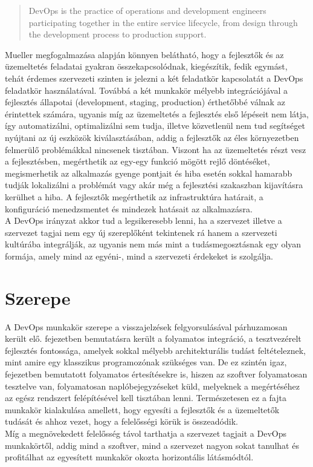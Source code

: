 \begin{quote}
DevOps is the practice of operations and development engineers participating together in the entire service lifecycle, from design through the development process to production support.
\end{quote}
\begin{flushright}
\citet*{agile_admin}
\end{flushright}

Mueller megfogalmazása alapján könnyen belátható, hogy a fejlesztők és az üzemeltetés feladatai gyakran összekapcsolódnak, kiegészítik, fedik egymást, tehát érdemes szervezeti szinten is jelezni a két feladatkör kapcsolatát a DevOps feladatkör használatával.
Továbbá a két munkakör mélyebb integrációjával a fejlesztés állapotai (development, staging, production) érthetőbbé válnak az érintettek számára, ugyanis míg az üzemeltetés a fejlesztés első lépéseit nem látja, így automatizálni, optimalizálni sem tudja, illetve közvetlenül nem tud segítséget nyújtani az új eszközök kiválasztásában, addig a fejlesztők az éles környezetben felmerülő problémákkal nincsenek tisztában. Viszont ha az üzemeltetés részt vesz a fejlesztésben, megérthetik az egy-egy funkció mögött rejlő döntéséket, megismerhetik az alkalmazás gyenge pontjait és hiba esetén sokkal hamarabb tudják lokalizálni a problémát vagy akár még a fejlesztési szakaszban kijavításra kerülhet a hiba. A fejlesztők megérthetik az infrastruktúra határait, a konfiguráció menedzsmentet és mindezek hatásait az alkalmazásra.\\
A DevOps irányzat akkor tud a legsikeresebb lenni, ha a szervezet illetve a szervezet tagjai nem egy új szereplőként tekintenek rá hanem a szervezeti kultúrába integrálják, az ugyanis nem más mint a tudásmegosztásnak egy olyan formája, amely mind az egyéni-, mind a szervezeti érdekeket is szolgálja.

\section{Szerepe}

A DevOps munkakör szerepe a visszajelzések felgyorsulásával párhuzamosan került elő.  fejezetben bemutatásra került a folyamatos integráció, a tesztvezérelt fejlesztés fontossága, amelyek sokkal mélyebb architekturális tudást feltételeznek, mint amire egy klasszikus programozónak szükséges van. De ez szintén igaz,  fejezetben bemutatott folyamatos értesítésekre is, hiszen az szoftver folyamatosan tesztelve van, folyamatosan naplóbejegyzéseket küld, melyeknek a megértéséhez az egész rendszert felépítésével kell tisztában lenni. Természetesen ez a fajta munkakör kialakulása amellett, hogy egyesíti a fejlesztők és a üzemeltetők tudását és ahhoz vezet, hogy a felelősségi körük is összeadódik.\\
Míg a megnövekedett felelősség távol tarthatja a szervezet tagjait a DevOps munkakörtől, addig mind a szoftver, mind a szervezet nagyon sokat tanulhat és profitálhat az egyesített munkakör okozta horizontális látásmódtól.

